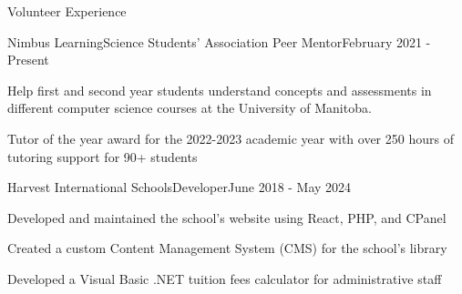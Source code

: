 \begin{resume_section}{Volunteer Experience}
    \begin{resume_employer}{Nimbus Learning}{Science Students' Association Peer Mentor}{}{February 2021 - Present}
        \item Help first and second year students understand concepts and assessments in different computer science courses at the University of Manitoba.
        \item Tutor of the year award for the 2022-2023 academic year with over 250 hours of tutoring support for 90+ students
    \end{resume_employer}

    \begin{resume_employer}{Harvest International Schools}{Developer}{}{June 2018 - May 2024}
        \item Developed and maintained the school's website using React, PHP, and CPanel
        \item Created a custom Content Management System (CMS) for the school's library
        \item Developed a Visual Basic .NET tuition fees calculator for administrative staff
    \end{resume_employer}
\end{resume_section}

